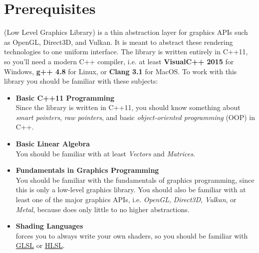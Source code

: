 \documentclass{article}
\begin{document}

\newpage
\section{Prerequisites}

\LLGL (Low Level Graphics Library) is a thin abstraction layer for graphics APIs such as
OpenGL, Direct3D, and Vulkan. It is meant to abstract these rendering technologies to one uniform interface.
The library is written entirely in C++11, so you'll
need a modern C++ compiler, i.e. at least \textbf{VisualC++ 2015} for Windows,
\textbf{g++ 4.8} for Linux, or \textbf{Clang 3.1} for MacOS.
To work with this library you should be familiar with these subjects:
\begin{itemize}
	\item \textbf{Basic C++11 Programming} \\
	Since the library is written in C++11, you should know something about \emph{smart pointers},
	\emph{raw pointers}, and basic \emph{object-oriented programming} (OOP) in C++.
	
	\item \textbf{Basic Linear Algebra} \\
	You should be familiar with at least \emph{Vectors} and \emph{Matrices}.
	
	\item \textbf{Fundamentals in Graphics Programming} \\
	You should be familiar with the fundamentals of graphics programming, since this is only a low-level graphics library.
	You should also be familiar with at least one of the major graphics APIs,
	i.e. \emph{OpenGL}, \emph{Direct3D}, \emph{Vulkan}, or \emph{Metal},
	because \LLGL does only little to no higher abstractions.
	
	\item \textbf{Shading Languages} \\
	\LLGL forces you to always write your own shaders, so you should be familiar with
	\href{https://www.opengl.org/documentation/glsl/}{GLSL} or
	\href{https://docs.microsoft.com/en-us/windows/desktop/direct3dhlsl/dx-graphics-hlsl}{HLSL}.
\end{itemize}


\end{document}
